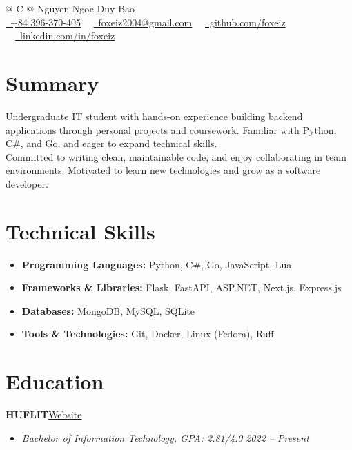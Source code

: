 \documentclass[a4paper,12pt]{article}
\newenvironment{itemList}[3][]
    {
    \noindent\hspace{1em}\textbf{#2}\hfill#3\\[3.75pt]
    \begin{minipage}[t]{\linewidth}
    \begin{itemize}[nosep,after=\strut, leftmargin=2em, itemsep=3pt, label={}, #1]
    }
    {
    \end{itemize}
    \end{minipage}
    }
\begin{document}
\pagestyle{empty}

\begin{tabularx}{\linewidth}{@{} C @{}}
    \Huge{Nguyen Ngoc Duy Bao} \\[7.5pt]
    \href{tel:+84396370405}{\raisebox{-0.05\height}\ +84 396-370-405} \ \textbar\
    \href{mailto:foxeiz2004@gmail.com}{\raisebox{-0.05\height}\ foxeiz2004@gmail.com} \ \textbar\
    \href{https://github.com/foxeiz}{\raisebox{-0.05\height}\ github.com/foxeiz} \ \textbar\
    \href{https://linkedin.com/in/foxeiz}{\raisebox{-0.05\height}\ linkedin.com/in/foxeiz}
\end{tabularx}

\section{Summary}
Undergraduate IT student with hands-on experience building backend applications through personal projects and coursework. Familiar with Python, C\#, and Go, and eager to expand technical skills. \\ [5pt]
Committed to writing clean, maintainable code, and enjoy collaborating in team environments. Motivated to learn new technologies and grow as a software developer.

\section{Technical Skills}
\begin{itemize}[nosep,after=\strut, leftmargin=1em, itemsep=4pt, label={}]
    \item \textbf{Programming Languages:} Python, C\#, Go, JavaScript, Lua
    \item \textbf{Frameworks \& Libraries:} Flask, FastAPI, ASP.NET, Next.js, Express.js
    \item \textbf{Databases:} MongoDB, MySQL, SQLite
    \item \textbf{Tools \& Technologies:} Git, Docker, Linux (Fedora), Ruff
\end{itemize}

\section{Education}
\begin{itemList}{HUFLIT}{\href{https://huflit.edu.vn/}{Website}}
    \item \textit{Bachelor of Information Technology, GPA: 2.81/4.0} \hfill \textit{2022 -- Present}
\end{itemList}
\end{document}
